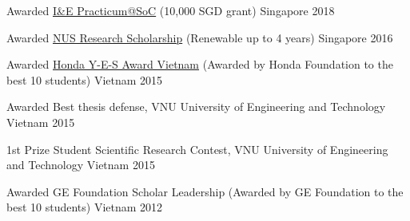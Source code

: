 
\begin{cvhonors}

\cvhonor
    {Awarded} %
    {\href{https://www.comp.nus.edu.sg/entrepreneurship/awards/winners/}{I\&E Practicum@SoC} (10,000 SGD grant)} %
    {Singapore} %
    {2018} %


\cvhonor
    {Awarded} %
    {\href{http://www.nus.edu.sg/admissions/graduate-studies/scholarships-financial-aid-and-fees/scholarships-awards/nus-research-scholarship.html}{NUS Research Scholarship} (Renewable up to 4 years)} %
    {Singapore} %
    {2016} %

  \cvhonor
    {Awarded} %
    {\href{http://www.hondafoundation.jp/yes/index_en/184}{Honda Y-E-S Award Vietnam} (Awarded by Honda Foundation to the best 10 students)} %
    {Vietnam} %
    {2015} %

  \cvhonor
    {Awarded} %
    {Best thesis defense, VNU University of Engineering and Technology} %
    {Vietnam} %
    {2015} %

  \cvhonor
    {1st Prize} %
    {Student Scientific Research Contest, VNU University of Engineering and Technology} %
    {Vietnam} %
    {2015} %

  \cvhonor
    {Awarded} %
    {GE Foundation Scholar Leadership (Awarded by GE Foundation to the best 10 students)} %
    {Vietnam} %
    {2012} %

\end{cvhonors}





